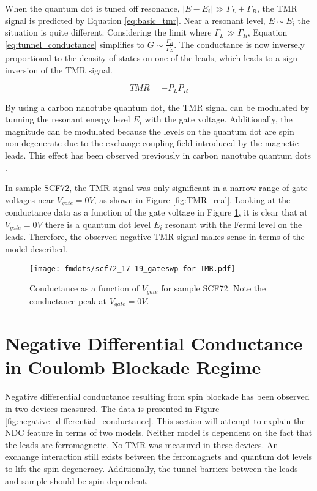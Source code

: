 When the quantum dot is tuned off resonance, $|E-E_i| \gg \Gamma_L + \Gamma_R$, the TMR signal is predicted by Equation \ref{eq:basic_tmr}. Near a resonant level, $E \sim E_i$ the situation is quite different. Considering the limit where $\Gamma_L \gg \Gamma_R$, Equation \ref{eq:tunnel_conductance} simplifies to $G \sim \frac{\Gamma_R}{\Gamma_L}$. The conductance is now inversely proportional to the density of states on one of the leads, which leads to a sign inversion of the TMR signal.

\begin{equation}
\label{eq:sign_inversion}
    TMR = -P_L P_R
\end{equation}

By using a carbon nanotube quantum dot, the TMR signal can be modulated by tunning the resonant energy level $E_i$ with the gate voltage. Additionally, the magnitude can be modulated because the levels on the quantum dot are spin non-degenerate due to the exchange coupling field introduced by the magnetic leads. This effect has been observed previously in carbon nanotube quantum dots \cite{Sahoo2005, Thamankar2006}. 

In sample SCF72, the TMR signal was only significant in a narrow range of gate voltages near $V_{gate}=0V$, as shown in Figure \ref{fig:TMR_real}. Looking at the conductance data as a function of the gate voltage in Figure \ref{fig:TMR_gate}, it is clear that at $V_{gate}=0V$ there is a quantum dot level $E_i$ resonant with the Fermi level on the leads. Therefore, the observed negative TMR signal makes sense in terms of the model described.

\begin{figure}
    \centering
    \texttt{[image: fmdots/scf72\_17-19\_gateswp-for-TMR.pdf]}
    \caption{Conductance as a function of $V_{gate}$ for sample SCF72. Note the conductance peak at $V_{gate}=0V$.}
    \label{fig:TMR_gate}
\end{figure}

\section{Negative Differential Conductance in Coulomb Blockade Regime}

Negative differential conductance resulting from spin blockade has been observed in two devices measured. The data is presented in Figure \ref{fig:negative_differential_conductance}. This section will attempt to explain the NDC feature in terms of two models. Neither model is dependent on the fact that the leads are ferromagnetic. No TMR was measured in these devices. An exchange interaction still exists between the ferromagnets and quantum dot levels to lift the spin degeneracy. Additionally, the tunnel barriers between the leads and sample should be spin dependent.

